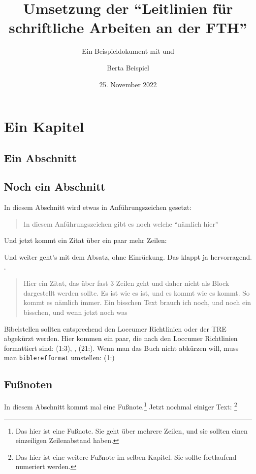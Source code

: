 \documentclass{scrreport}
\begin{document}
\title{Umsetzung der \enquote{Leitlinien für schriftliche Arbeiten an der FTH}}
\subtitle{Ein Beispieldokument mit  und }
\author{Berta Beispiel}
\date{25. November 2022}

\maketitle

\tableofcontents

\chapter{Ein Kapitel}
\label{chap:firstchapter}
\section{Ein Abschnitt}
\lipsum

\section{Noch ein Abschnitt}
In diesem Abschnitt wird etwas in Anführungszeichen gesetzt: \blockquote{In diesem Anführungszeichen gibt es noch welche \enquote{nämlich hier}}. Und jetzt kommt ein Zitat über ein paar mehr Zeilen: \blockquote{\lipsum[1]} Und weiter geht's mit dem Absatz, ohne Einrückung. Das klappt ja hervorragend. \lipsum[2]. \blockquote{Hier ein Zitat, das über fast 3 Zeilen geht und daher nicht als Block dargestellt werden sollte. Es ist wie es ist, und es kommt wie es kommt. So kommt es nämlich immer. Ein bisschen Text brauch ich noch, und noch ein bisschen, und wenn jetzt noch was}

\sloppy
Bibelstellen sollten entsprechend den Loccumer Richtlinien oder der TRE abgekürzt werden. Hier kommen ein paar, die nach den Loccumer Richtlinien formattiert sind: (1:3), , (21:). Wenn man das Buch nicht abkürzen will, muss man \texttt{biblerefformat} umstellen: { (1:)}

\fussy
\section{Fußnoten}
In diesem Abschnitt kommt mal eine Fußnote.\footnote{Das hier ist eine Fußnote. Sie geht über mehrere Zeilen, und sie sollten einen einzeiligen Zeilenabstand haben. \lipsum[1]} Jetzt nochmal einiger Text: \lipsum[1-9]\footnote{Das hier ist eine weitere Fußnote im selben Kapitel. Sie sollte fortlaufend numeriert werden.}
\end{document}
